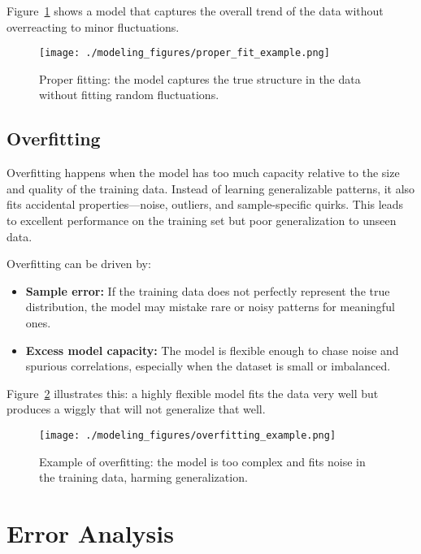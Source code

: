 \documentclass[12pt,openany, draft]{book}
\begin{document}
Figure~\ref{fig:proper-fitting-example} shows a model that captures the overall trend of the data without overreacting to minor fluctuations.

\begin{figure}[H]
    \centering
    \texttt{[image: ./modeling\_figures/proper\_fit\_example.png]}
    \caption{Proper fitting: the model captures the true structure in the data without fitting random fluctuations.}
    \label{fig:proper-fitting-example}
\end{figure}


\subsection{Overfitting} \label{subsec:overfitting}

Overfitting happens when the model has too much capacity relative to the size and quality of the training data. Instead of learning generalizable patterns, it also fits accidental properties—noise, outliers, and sample-specific quirks. This leads to excellent performance on the training set but poor generalization to unseen data. \newline

Overfitting can be driven by:
\begin{itemize}
    \item \textbf{Sample error:} If the training data does not perfectly represent the true distribution, the model may mistake rare or noisy patterns for meaningful ones.
    \item \textbf{Excess model capacity:} The model is flexible enough to chase noise and spurious correlations, especially when the dataset is small or imbalanced.
\end{itemize}

Figure~\ref{fig:overfitting-example} illustrates this: a highly flexible model fits the data very well but produces a wiggly that will not generalize that well.

\begin{figure}[H]
    \centering
    \texttt{[image: ./modeling\_figures/overfitting\_example.png]}
    \caption{Example of overfitting: the model is too complex and fits noise in the training data, harming generalization.}
    \label{fig:overfitting-example}
\end{figure}



\section{Error Analysis} \label{sec:error_analysis}
\end{document}
